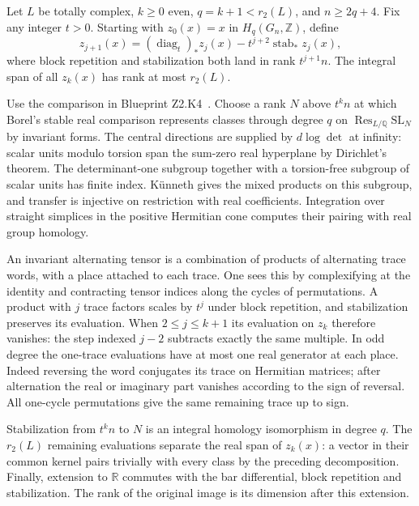 \begin{formalstatement}\label{pn:P034}
Let \(L\) be totally complex, \(k\ge0\) even, \(q=k+1<r_2(L)\), and
\(n\ge2q+4\). Fix any integer \(t>0\). Starting with \(z_0(x)=x\)
in \(H_q(G_n,\mathbb Z)\), define
\[
 z_{j+1}(x)=(\operatorname{diag}_t)_*z_j(x)
                 -t^{j+2}\operatorname{stab}_*z_j(x),
\]
where block repetition and stabilization both land in rank \(t^{j+1}n\).
The integral span of all \(z_k(x)\) has rank at most \(r_2(L)\).
\end{formalstatement}
\begin{outline}
Use the comparison in Blueprint Z2.K4~. Choose a rank \(N\) above
\(t^kn\) at which Borel's stable real comparison represents classes
through degree \(q\) on \(\operatorname{Res}_{L/\mathbb Q}\mathrm{SL}_N\)
by invariant forms. The central directions are supplied by
\(d\log\det\) at infinity: scalar units modulo torsion span the
sum-zero real hyperplane by Dirichlet's theorem. The determinant-one
subgroup together with a torsion-free subgroup of scalar units has
finite index. Künneth gives the mixed products on this subgroup,
and transfer is injective on restriction with real coefficients.
Integration over straight simplices in the positive Hermitian cone
computes their pairing with real group homology.

An invariant alternating tensor is a combination of products of
alternating trace words, with a place attached to each trace.
One sees this by complexifying at the identity and contracting tensor
indices along the cycles of permutations. A product with \(j\)
trace factors scales by \(t^j\) under block repetition, and
stabilization preserves its evaluation. When \(2\le j\le k+1\) its
evaluation on \(z_k\) therefore vanishes: the step indexed \(j-2\)
subtracts exactly the same multiple. In odd degree the one-trace
evaluations have at most one real generator at each place. Indeed
reversing the word conjugates its trace on Hermitian matrices; after
alternation the real or imaginary part vanishes according to the
sign of reversal. All one-cycle permutations give the same remaining
trace up to sign.

Stabilization from \(t^kn\) to \(N\) is an integral homology isomorphism
in degree \(q\). The \(r_2(L)\) remaining evaluations separate the real
span of \(z_k(x)\): a vector in their common kernel pairs trivially
with every class by the preceding decomposition. Finally,
extension to \(\mathbb R\) commutes with the bar differential, block
repetition and stabilization. The rank of the original image is its
dimension after this extension.
\end{outline}

